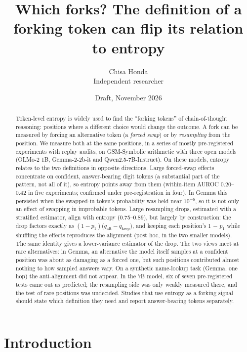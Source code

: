 \documentclass[
  10pt,
  a4paper,
]{article}
\title{Which forks? The definition of a forking token can flip its relation to entropy}
\author{Chisa Honda\\[2pt] {\small Independent researcher}}
\date{Draft, November 2026}
\begin{document}
\maketitle

\begin{abstract}

Token-level entropy is widely used to find the ``forking tokens'' of chain-of-thought reasoning: positions where a different choice would change the outcome. A fork can be measured by forcing an
alternative token (a \emph{forced swap}) or by \emph{resampling} from the position. We measure both at the same positions, in a series of mostly pre-registered experiments with replay audits, on
GSM-Symbolic arithmetic with three open models (OLMo-2 1B, Gemma-2-2b-it and Qwen2.5-7B-Instruct). On these models, entropy relates to the two definitions in opposite directions. Large forced-swap
effects concentrate on confident, answer-bearing digit tokens (a substantial part of the pattern, not all of it), so entropy points away from them (within-item AUROC 0.20--0.42 in five experiments;
confirmed under pre-registration in four). In Gemma this persisted when the swapped-in token's probability was held near \(10^{-6}\), so it is not only an effect of swapping in improbable tokens.
Large resampling drops, estimated with a stratified estimator, align with entropy (0.75--0.89), but largely by construction: the drop factors exactly as
\((1-p_1)\)(\(q_{\mathrm{alt}} - q_{\mathrm{keep}}\)), and keeping each position's 1 − \(p_1\) while shuffling the effects reproduces the alignment (post hoc, in the two smaller models). The same
identity gives a lower-variance estimator of the drop. The two views meet at rare alternatives: in Gemma, an alternative the model itself samples at a confident position was about as damaging as a
forced one, but such positions contributed almost nothing to how sampled answers vary. On a synthetic name-lookup task (Gemma, one hop) the anti-alignment did not appear. In the 7B model, six of seven
pre-registered tests came out as predicted; the resampling side was only weakly measured there, and the test of rare positions was undecided. Studies that use entropy as a forking signal should state
which definition they need and report answer-bearing tokens separately.

\end{abstract}

\hypertarget{introduction}{%
\section{Introduction}\label{introduction}}
\end{document}
